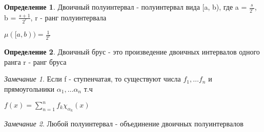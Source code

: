 \documentclass[a4paper, 12pt]{article}
\theoremstyle{definition}
\newtheorem*{definition}{Определение}
\theoremstyle{remark}
\newtheorem*{remark}{Замечание}
\begin{document}
\begin{definition}
     Двоичный полуинтервал - полуинтервал вида [a, b), где a = $\frac{s}{2^r}$, b = $\frac{s+1}{2^r}$, r - ранг полуинтервала

     $\mu([a,b)) = \frac{1}{2^r}$
\end{definition}
\begin{definition}
     Двоичный брус - это произведение двоичных интервалов одного ранга r - ранг бруса
\end{definition}
\begin{remark}
     Если f - ступенчатая, то существуют числа $f_1,\dots f_n$ и прямоугольники $\alpha_1, \dots\alpha_n$ т.ч

     $f(x) = \sum_{n=1}^n f_k \chi_{\alpha_k}(x)$
\end{remark}
\begin{remark}
     Любой полуинтервал - объединение двоичных полуинтервалов
\end{remark}
\end{document}
